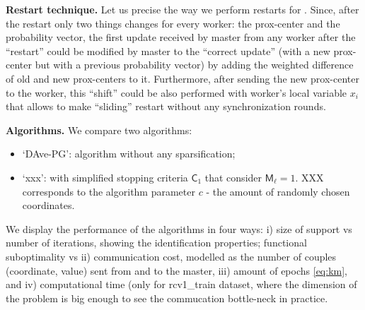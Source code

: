 \textbf{Restart technique.} Let us precise the way we perform restarts for \recoalgo. Since, after the restart only two things changes for every worker: the prox-center and the probability vector, the first update received by master from any worker after the ``restart'' could be modified by master to the ``correct update'' (with a new prox-center but with a previous probability vector) by adding the weighted difference of old and new prox-centers to it. Furthermore, after sending the new prox-center to the worker, this ``shift'' could be also performed with worker's local variable $x_i$ that allows to make ``sliding'' restart without any synchronization rounds.




\medskip
\noindent
\textbf{Algorithms.} We compare two algorithms: 
\begin{itemize}
\item `DAve-PG': \dave algorithm without any sparsification;
\item `xxx': \recoalgo with simplified stopping criteria $\mathsf{C}_1$ that consider $\mathsf{M}_\ell=1$. XXX corresponds to the algorithm parameter $c$ - the amount of randomly chosen coordinates.
\end{itemize}

We display the performance of the algorithms in four ways: i) size of support vs number of iterations, showing the identification properties; functional suboptimality vs ii) communication cost, modelled as the number of couples (coordinate, value) sent from and to the master, iii) amount of epochs \eqref{eq:km}, and iv) computational time (only for rcv1\_train dataset, where the dimension of the problem is big enough to see the commucation bottle-neck in practice.